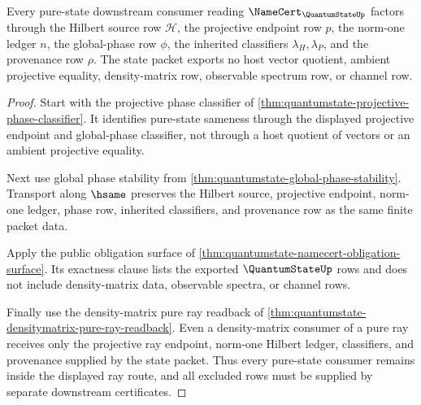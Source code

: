 \begin{theorem}
\label{thm:quantumstate-projective-ray-nonescape}
Every pure-state downstream consumer reading $\NameCert_{\QuantumStateUp}$ factors through the Hilbert source row $\mathcal{H}$, the projective endpoint row $p$, the norm-one ledger $n$, the global-phase row $\phi$, the inherited classifiers $\lambda_H,\lambda_P$, and the provenance row $\rho$. The state packet exports no host vector quotient, ambient projective equality, density-matrix row, observable spectrum row, or channel row.
\end{theorem}
\begin{proof}
Start with the projective phase classifier of \autoref{thm:quantumstate-projective-phase-classifier}. It identifies pure-state sameness through the displayed projective endpoint and global-phase classifier, not through a host quotient of vectors or an ambient projective equality.

Next use global phase stability from \autoref{thm:quantumstate-global-phase-stability}. Transport along $\hsame$ preserves the Hilbert source, projective endpoint, norm-one ledger, phase row, inherited classifiers, and provenance row as the same finite packet data.

Apply the public obligation surface of \autoref{thm:quantumstate-namecert-obligation-surface}. Its exactness clause lists the exported $\QuantumStateUp$ rows and does not include density-matrix data, observable spectra, or channel rows.

Finally use the density-matrix pure ray readback of \autoref{thm:quantumstate-densitymatrix-pure-ray-readback}. Even a density-matrix consumer of a pure ray receives only the projective ray endpoint, norm-one Hilbert ledger, classifiers, and provenance supplied by the state packet. Thus every pure-state consumer remains inside the displayed ray route, and all excluded rows must be supplied by separate downstream certificates.
\end{proof}

